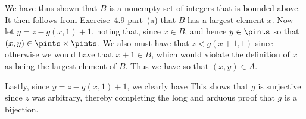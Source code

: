 {{    We have thus shown that $B$ is a nonempty set of integers that is bounded above.
    It then follows from Exercise~4.9 part~(a) that $B$ has a largest element $x$.
    Now let $y = z - g(x,1) + 1$, noting that, since $x \in B$,
    and hence $y \in \pints$ so that $(x,y) \in \zps$.
    We also must have that $z < g(x+1,1)$ since otherwise we would have that $x+1 \in B$, which would violate the definition of $x$ as being the largest element of $B$.
    Thus we have
    so that $(x,y) \in A$.
    
    Lastly, since $y = z - g(x,1) + 1$, we clearly have
    This shows that $g$ is surjective since $z$ was arbitrary, thereby completing the long and arduous proof that $g$ is a bijection.
  }
}

